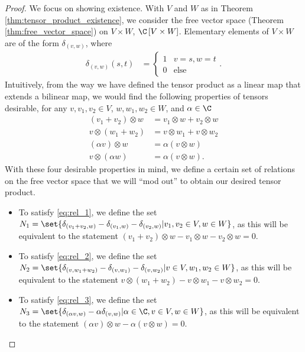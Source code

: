\begin{proof}
  We focus on showing existence. With $V$ and $W$ as in Theorem \ref{thm:tensor_product_existence}, we consider the free vector space (Theorem \ref{thm:free_vector_space}) on $V\times W$, $\C\left[ V\times W \right]$. Elementary elements of $V\times W$ are of the form $\delta_{(v,w)}$, where
  \begin{align*}
    \delta_{(v,w)} \left( s,t \right) &= \begin{cases}
      1 & v=s,w=t\\
      0 & \text{else}
    \end{cases}.
  \end{align*}
  Intuitively, from the way we have defined the tensor product as a linear map that extends a bilinear map, we would find the following properties of tensors desirable, for any $v,v_1,v_2\in V$, $w,w_1,w_2\in W$, and $\alpha\in \C$
  \begin{align*}
    \left( v_1 + v_2 \right)\otimes w &= v_1\otimes w + v_2\otimes w\label{eq:rel_1}\tag{1}\\
    v\otimes\left( w_1 + w_2 \right) &= v\otimes w_1 + v\otimes w_2\label{eq:rel_2}\tag{2}\\
    \left( \alpha v \right)\otimes w &= \alpha \left( v\otimes w \right)\label{eq:rel_3}\tag{3}\\
    v\otimes \left( \alpha w \right) &= \alpha \left( v\otimes w \right)\label{eq:rel_4}\tag{4}.
  \end{align*}
  With these four desirable properties in mind, we define a certain set of relations on the free vector space that we will ``mod out'' to obtain our desired tensor product. 
  \begin{itemize}
    \item To satisfy \eqref{eq:rel_1}, we define the set $N_1 = \set{\delta_{\left( v_1 + v_2,w \right)} - \delta_{\left( v_1,w \right)} - \delta_{\left( v_2,w \right)} | v_1,v_2\in V,w\in W}$, as this will be equivalent to the statement $\left( v_1 + v_2 \right)\otimes w - v_1\otimes w - v_2\otimes w = 0$.
    \item To satisfy \eqref{eq:rel_2}, we define the set $N_2 = \set{\delta_{\left( v,w_1 + w_2 \right)} - \delta_{\left( v,w_1 \right)} - \delta_{\left( v,w_2 \right)} | v\in V,w_1,w_2\in W}$, as this will be equivalent to the statement $v\otimes \left( w_1 + w_2 \right) - v\otimes w_1 - v\otimes w_2 = 0$.
    \item To satisfy \eqref{eq:rel_3}, we define the set $N_3 = \set{\delta_{\left( \alpha v,w \right)} - \alpha \delta_{\left( v,w \right)} | \alpha\in\C,v\in V,w\in W}$, as this will be equivalent to the statement $\left( \alpha v \right)\otimes w - \alpha \left( v\otimes w \right) = 0$.

\end{itemize}
\end{proof}

